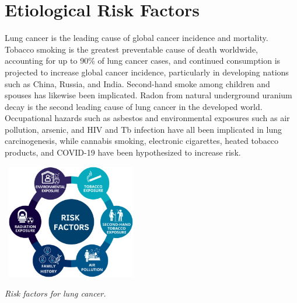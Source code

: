 
\section{Etiological Risk Factors}

Lung cancer is the leading cause of global cancer incidence and mortality. Tobacco smoking is the 
greatest preventable cause of death worldwide, accounting for up to 90\% of lung cancer cases, and 
continued consumption is projected to increase global cancer incidence, particularly in developing 
nations such as China, Russia, and India. Second-hand smoke among children and spouses has likewise 
been implicated. Radon from natural underground uranium decay is the second leading cause of lung 
cancer in the developed world. Occupational hazards such as asbestos and environmental exposures 
such as air pollution, arsenic, and HIV and Tb infection have all been implicated in lung 
carcinogenesis, while cannabis smoking, electronic cigarettes, heated tobacco products, and COVID-19 
have been hypothesized to increase risk. \cite{PMC8063897}

\vspace{1em}
\begin{center} 
    \includegraphics[width = 6cm, height = 5cm]{../assets/02-etiology/risk-factors-lunf-cancer.jpg}

    \small\textit{Risk factors for lung cancer. \cite{florez2023lung}}
\end{center}
\vspace{1em}


